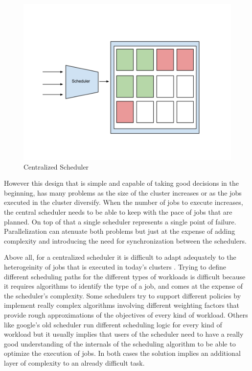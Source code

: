 \documentclass{report}                     %
\begin{document}
\begin{figure}[!ht]
  \centering
  \includegraphics[scale=0.25,natwidth=960,natheight=720]{CentralizedScheduler.png}
  \caption{Centralized Scheduler}
  \label{fig:centralized}
\end{figure}

However this design that is simple and capable of taking good
decisions in the beginning, has many problems as the size of the
cluster increases or as the jobs executed in the cluster
diversify. When the number of jobs to execute increases, the central
scheduler needs to be able to keep with the pace of jobs that are
planned. On top of that a single scheduler represents a single point
of failure. Parallelization can atenuate both problems but just at the
expense of adding complexity and introducing the need for synchronization
between the schedulers.

Above all, for a centralized scheduler it is difficult to adapt
adequately to the heterogeinity of jobs that is executed in today's
clusters \cite{37201}. Trying to define different scheduling paths for
the different types of workloads is difficult because it requires
algorithms to identify the type of a job, and comes at the expense of
the scheduler's complexity. Some schedulers try to support different
policies by implement really complex algorithms involving different
weighting factors that provide rough approximations of the objectives
of every kind of workload. Others like google's old scheduler run
different scheduling logic for every kind of workload but it usually
implies that users of the scheduler need to have a really good
understanding of the internals of the scheduling algorithm to be able
to optimize the execution of jobs. In both cases the solution implies
an additional layer of complexity to an already difficult task.
\end{document}

